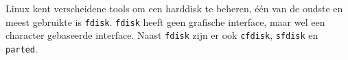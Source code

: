 Linux kent verscheidene tools om een harddisk te beheren, \'e\'en van de oudste en meest gebruikte is \texttt{fdisk}. \texttt{fdisk} heeft geen grafische interface, maar wel een character gebaseerde interface. Naast \texttt{fdisk} zijn er ook \texttt{cfdisk}, \texttt{sfdisk} en \texttt{parted}.

